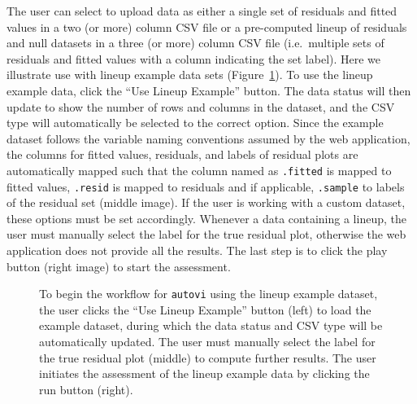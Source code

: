 \documentclass[
doublespace,
  times]{anzsauth}
\providecommand{\DIFaddbeginFL}{} %
\providecommand{\DIFaddendFL}{} %
\providecommand{\DIFdelbeginFL}{} %
\providecommand{\DIFdelendFL}{} %
\newcommand{\DIFscaledelfig}{0.5}
\newlength{\DIFdelgraphicswidth} %
\newlength{\DIFdelgraphicsheight} %
\newcommand{\DIFaddincludegraphics}[2][]{{\color{blue}\fbox{\DIFOincludegraphics[#1]{#2}}}} %
\newcommand{\DIFdelincludegraphics}[2][]{%
\sbox{\DIFdelgraphicsbox}{\DIFOincludegraphics[#1]{#2}}%
\settoboxwidth{\DIFdelgraphicswidth}{\DIFdelgraphicsbox} %
\settoboxtotalheight{\DIFdelgraphicsheight}{\DIFdelgraphicsbox} %
\scalebox{\DIFscaledelfig}{%
\parbox[b]{\DIFdelgraphicswidth}{\usebox{\DIFdelgraphicsbox}\\[-\baselineskip] \rule{\DIFdelgraphicswidth}{0em}}\llap{\resizebox{\DIFdelgraphicswidth}{\DIFdelgraphicsheight}{%
\setlength{\unitlength}{\DIFdelgraphicswidth}%
\begin{picture}(1,1)%
\thicklines\linethickness{2pt} %
{\color[rgb]{1,0,0}\put(0,0){\framebox(1,1){}}}%
{\color[rgb]{1,0,0}\put(0,0){\line( 1,1){1}}}%
{\color[rgb]{1,0,0}\put(0,1){\line(1,-1){1}}}%
\end{picture}%
}\hspace*{3pt}}} %
} %
\DeclareRobustCommand{\DIFaddbeginFL}{\DIFOaddbeginFL \let\includegraphics\DIFaddincludegraphics} %
\DeclareRobustCommand{\DIFaddendFL}{\DIFOaddendFL \let\includegraphics\DIFOincludegraphics} %
\DeclareRobustCommand{\DIFdelbeginFL}{\DIFOdelbeginFL \let\includegraphics\DIFdelincludegraphics} %
\DeclareRobustCommand{\DIFdelendFL}{\DIFOaddendFL \let\includegraphics\DIFOincludegraphics} %
\begin{document}
The user can select to upload data as either a single set of residuals
and fitted values in a two (or more) column CSV file or a pre-computed
lineup of residuals and null datasets in a three (or more) column CSV
file (i.e.~multiple sets of residuals and fitted values with a column
indicating the set label). Here we illustrate use with lineup example
data sets (Figure~\ref{fig-autovi-web-setup}). To use the lineup example
data, click the ``Use Lineup Example'' button. The data status will then
update to show the number of rows and columns in the dataset, and the
CSV type will automatically be selected to the correct option. Since the
example dataset follows the variable naming conventions assumed by the
web application, the columns for fitted values, residuals, and labels of
residual plots are automatically mapped such that the column named as
\texttt{.fitted} is mapped to fitted values, \texttt{.resid} is mapped
to residuals and if applicable, \texttt{.sample} to labels of the
residual set (middle image). If the user is working with a custom
dataset, these options must be set accordingly. Whenever a data
containing a lineup, the user must manually select the label for the
true residual plot, otherwise the web application does not provide all
the results. The last step is to click the play button (right image) to
start the assessment.

\begin{figure}

\DIFdelbeginFL %


\DIFdelendFL \DIFaddbeginFL {}
\DIFaddendFL

\caption{\label{fig-autovi-web-setup}To begin the workflow for
\texttt{autovi} using the lineup example dataset, the user clicks the
``Use Lineup Example'' button (left) to load the example dataset, during
which the data status and CSV type will be automatically updated. The
user must manually select the label for the true residual plot (middle)
to compute further results. The user initiates the assessment of the
lineup example data by clicking the run button (right).}

\end{figure}%
\end{document}
